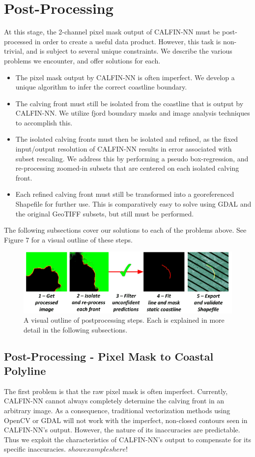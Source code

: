 \documentclass[tc, manuscript]{copernicus}
\begin{document}
\section{Post-Processing}
At this stage, the 2-channel pixel mask output of CALFIN-NN must be post-processed in order to create a useful data product. However, this task is non-trivial, and is subject to several unique constraints. We describe the various problems we encounter, and offer solutions for each.
\begin{itemize}
\item The pixel mask output by CALFIN-NN is often imperfect. We develop a unique algorithm to infer the correct coastline boundary.
\item The calving front must still be isolated from the coastline that is output by CALFIN-NN. We utilize fjord boundary masks and image analysis techniques to accomplish this.
\item The isolated calving fronts must then be isolated and refined, as the fixed input/output resolution of CALFIN-NN results in error associated with subset rescaling. We address this by performing a pseudo box-regression, and re-processing zoomed-in subsets that are centered on each isolated calving front.
\item Each refined calving front must still be transformed into a georeferenced Shapefile for further use. This is comparatively easy to solve using GDAL and the original GeoTIFF subsets, but still must be performed.
\end{itemize}
The following subsections cover our solutions to each of the problems above. See Figure 7 for a visual outline of these steps.

\begin{figure}[t]
\includegraphics[width=14cm]{pipeline-postprocess.png}
\centering
\caption{A visual outline of postprocessing steps. Each is explained in more detail in the following subsections.}
\end{figure}

\subsection{Post-Processing - Pixel Mask to Coastal Polyline}
The first problem is that the raw pixel mask is often imperfect. Currently, CALFIN-NN cannot always completely determine the calving front in an arbitrary image. As a consequence, traditional vectorization methods using OpenCV or GDAL will not work with the imperfect, non-closed contours seen in  CALFIN-NN's output. However, the nature of its inaccuracies are predictable. Thus we exploit the characteristics of CALFIN-NN's output to compensate for its specific inaccuracies. $show examples here!$
\end{document}

